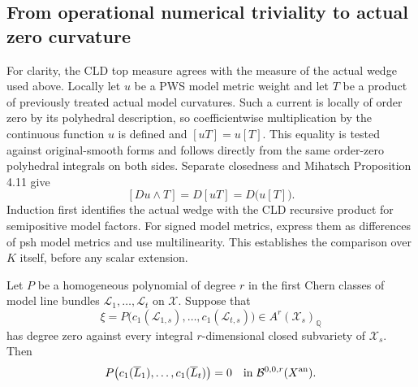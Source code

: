 \subsection{From operational numerical triviality to actual zero curvature}

For clarity, the CLD top measure agrees with the measure of the actual
wedge used above.  Locally let $u$ be a PWS model metric weight and let
$T$ be a product of previously treated actual model curvatures.  Such a
current is locally of order zero by its polyhedral description, so
coefficientwise multiplication by the continuous function $u$ is defined
and $[uT]=u[T]$. This equality is tested against original-smooth forms
and follows directly from the same order-zero polyhedral integrals
on both sides. Separate closedness and Mihatsch Proposition 4.11 give
\[
                  [Du\wedge T]=D[uT]=D\bigl(u[T]\bigr).
\]
Induction first identifies the actual wedge with the CLD recursive
product for semipositive model factors. For signed model metrics,
express them as differences of psh model
metrics and use multilinearity.  This establishes the comparison over
$K$ itself, before any scalar extension.

\begin{theorem}
\label{r10c:numerical-zero}
Let $P$ be a homogeneous polynomial of degree $r$ in the first Chern
classes of model line bundles $\mathcal L_1,\ldots,\mathcal L_t$ on
$\mathcal X$.  Suppose that
\[
       \xi=P\bigl(c_1(\mathcal L_{1,s}),\ldots,
                    c_1(\mathcal L_{t,s})\bigr)\in A^r(\mathcal X_s)_{\mathbb Q}
\]
has degree zero against every integral $r$-dimensional closed subvariety
of $\mathcal X_s$.  Then
\[
        P\bigl(c_1(\overline L_1),\ldots,c_1(\overline L_t)\bigr)=0
                 \quad\hbox{in }\mathcal B^{0,0,r}(X^{\rm an}).
\]
\end{theorem}

